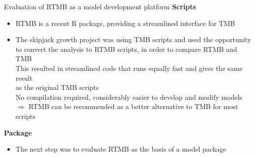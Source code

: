 \documentclass[aspectratio=169,fleqn]{beamer}
\begin{document}

\begin{frame}{Evaluation of RTMB as a model development platform}
  \textbf{\blue Scripts}\\[0.5ex]
  \begin{itemize}
    \item[] {\green RTMB} is a recent R package, providing a streamlined
    interface for TMB\\[1.5ex]
    \item[] The skipjack growth project was using TMB scripts and used the
    opportunity\\
    to convert the analysis to RTMB scripts, in order to compare RTMB and
    TMB\\[1.5ex]
    This resulted in {\green streamlined code} that runs equally fast and gives
    the same result\\
    as the original TMB scripts\\[1.5ex]
    No compilation required, considerably easier to develop and modify
    models\\[1.5ex]
    $\Rightarrow$ RTMB can be {\green recommended} as a better alternative to
    TMB for most scripts\\[3ex]
  \end{itemize}
  \textbf{\blue Package}\\[0.5ex]
  \begin{itemize}
    \item[] The next step was to evaluate RTMB as the basis of a {\green model
      package}\\[3ex]
  \end{itemize}
\end{frame}

\end{document}
